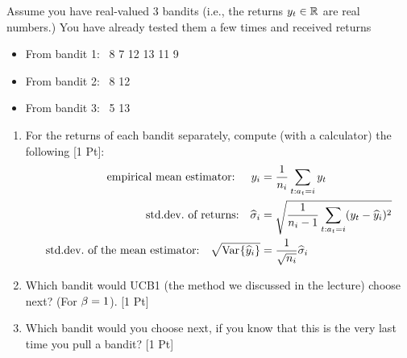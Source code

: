 

\renewcommand{\course}{Artificial Intelligence}
\renewcommand{\coursepicture}{course_ai}
\renewcommand{\coursedate}{Summer 2026}
\renewcommand{\teacher}{Sayantan Auddy}
\renewcommand{\exnum}{Exercise 3}

\exercises
{}
\exercisestitle



Assume you have real-valued 3 bandits (i.e., the returns $y_t\in{\mathbb{R}}$ are real numbers.) You have already tested them a few times
and received returns
\begin{itemize}
\item From bandit 1:~ 8 7 12 13 11 9
\item From bandit 2:~ 8 12
\item From bandit 3:~ 5 13
\end{itemize}

\begin{enumerate}
	\item For the returns of each bandit separately, compute (with a calculator) the following [1 Pt]:
  \begin{align}
    \text{empirical mean estimator: \quad} y_i &= \frac{1}{n_i} \sum_{t:a_t=i} y_t \\
    \text{std.dev.\ of returns:\quad} \widehat {\sigma}_i &= \sqrt{\frac{1}{n_i-1} \sum_{t:a_t=i} (y_t - \widehat y_i)^2} \\
      \text{std.dev.\ of the mean estimator:\quad} \sqrt{\text{Var}_{}\{\widehat y_i\}} &= \frac{1}{\sqrt{n_i}} \widehat {\sigma}_i
      \end{align}

  \item Which bandit would UCB1 (the method we discussed in the lecture) choose next? (For $\beta=1$). [1 Pt]

  \item Which bandit would you choose next, if you know
	  that this is the very last time you pull a bandit? [1 Pt]

\end{enumerate}

